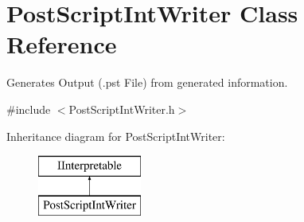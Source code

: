 \hypertarget{class_post_script_int_writer}{}\section{Post\+Script\+Int\+Writer Class Reference}
\label{class_post_script_int_writer}


Generates Output (.pst File) from generated information.  




{\ttfamily \#include $<$Post\+Script\+Int\+Writer.\+h$>$}

Inheritance diagram for Post\+Script\+Int\+Writer\+:\begin{figure}[H]
\begin{center}
\leavevmode
\includegraphics[height=2.000000cm]{class_post_script_int_writer}
\end{center}
\end{figure}
